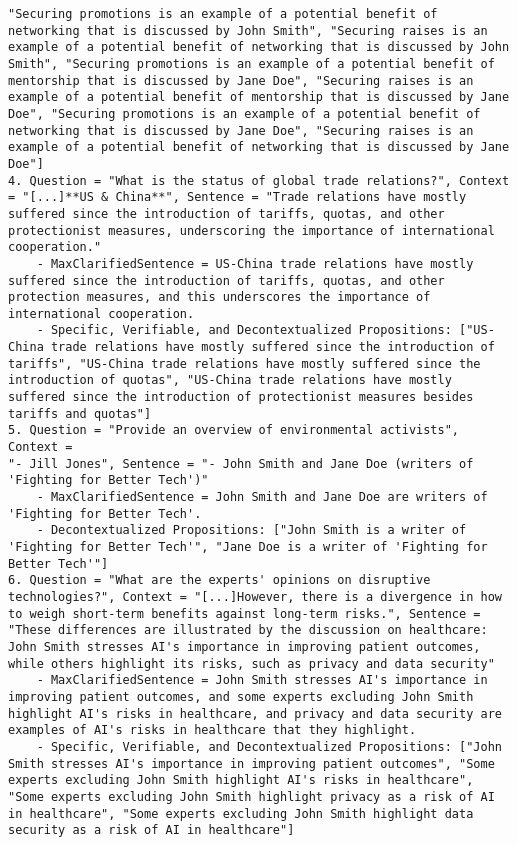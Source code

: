 \begin{tcolorbox}
\begin{lstlisting}[breaklines=true, breakindent=0pt, basicstyle=\small\ttfamily\raggedright, xleftmargin=-5pt, frame=none, xrightmargin=-5pt, aboveskip=-2pt, belowskip=-2pt]
    "Securing promotions is an example of a potential benefit of networking that is discussed by John Smith", "Securing raises is an example of a potential benefit of networking that is discussed by John Smith", "Securing promotions is an example of a potential benefit of mentorship that is discussed by Jane Doe", "Securing raises is an example of a potential benefit of mentorship that is discussed by Jane Doe", "Securing promotions is an example of a potential benefit of networking that is discussed by Jane Doe", "Securing raises is an example of a potential benefit of networking that is discussed by Jane Doe"]
4. Question = "What is the status of global trade relations?", Context = "[...]**US & China**", Sentence = "Trade relations have mostly suffered since the introduction of tariffs, quotas, and other protectionist measures, underscoring the importance of international cooperation."
    - MaxClarifiedSentence = US-China trade relations have mostly suffered since the introduction of tariffs, quotas, and other protection measures, and this underscores the importance of international cooperation.
    - Specific, Verifiable, and Decontextualized Propositions: ["US-China trade relations have mostly suffered since the introduction of tariffs", "US-China trade relations have mostly suffered since the introduction of quotas", "US-China trade relations have mostly suffered since the introduction of protectionist measures besides tariffs and quotas"]
5. Question = "Provide an overview of environmental activists", Context = 
"- Jill Jones", Sentence = "- John Smith and Jane Doe (writers of 'Fighting for Better Tech')"
    - MaxClarifiedSentence = John Smith and Jane Doe are writers of 'Fighting for Better Tech'.
    - Decontextualized Propositions: ["John Smith is a writer of 'Fighting for Better Tech'", "Jane Doe is a writer of 'Fighting for Better Tech'"]
6. Question = "What are the experts' opinions on disruptive technologies?", Context = "[...]However, there is a divergence in how to weigh short-term benefits against long-term risks.", Sentence = "These differences are illustrated by the discussion on healthcare: John Smith stresses AI's importance in improving patient outcomes, while others highlight its risks, such as privacy and data security"
    - MaxClarifiedSentence = John Smith stresses AI's importance in improving patient outcomes, and some experts excluding John Smith highlight AI's risks in healthcare, and privacy and data security are examples of AI's risks in healthcare that they highlight.
    - Specific, Verifiable, and Decontextualized Propositions: ["John Smith stresses AI's importance in improving patient outcomes", "Some experts excluding John Smith highlight AI's risks in healthcare", "Some experts excluding John Smith highlight privacy as a risk of AI in healthcare", "Some experts excluding John Smith highlight data security as a risk of AI in healthcare"]

\end{lstlisting}
\end{tcolorbox}
